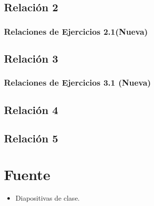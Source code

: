 \documentclass[a4paper,12pt]{article}
\begin{document}
\subsection{Relación 2}
\subsubsection{Relaciones de Ejercicios 2.1(Nueva)}


\subsection{Relación 3}

\subsubsection{Relaciones de Ejercicios 3.1 (Nueva)}


\subsection{Relación 4}


\subsection{Relación 5}



\section{Fuente}
\begin{itemize}
    \item Diapositivas de clase.
\end{itemize}
\end{document}
